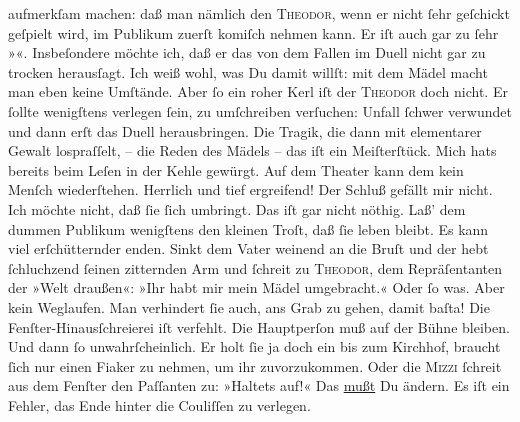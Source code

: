                aufmerkſam machen: daß man nämlich den \textsc{Theodor}, wenn er nicht  ſehr geſchickt
               geſpielt wird, im Publikum zuerſt komiſch nehmen kann. Er iſt auch gar zu ſehr
                  »\label{K_L02726-4v}\label{K_L02726-4}«. Insbeſondere
               möchte ich, daß er das von dem Fallen im Duell nicht gar zu trocken herausſagt. Ich
               weiß wohl, was Du damit willſt: mit {\pb}dem Mädel macht
               man eben keine Umſtände. Aber ſo ein roher Kerl iſt der \textsc{Theodor} doch nicht. Er ſollte wenigſtens verlegen ſein, zu umſchreiben verſuchen:
               Unfall {\dotsfour} ſchwer verwundet {\dotsfour} und
                   dann erſt das Duell herausbringen. Die Tragik,
               die dann mit elementarer Gewalt lospraſſelt, – die Reden des Mädels – das iſt ein Meiſterſtück. Mich hats bereits
               beim Leſen in der Kehle gewürgt. Auf dem Theater kann dem kein Menſch wiederſtehen.
               Herrlich und tief ergreifend! Der Schluß gefällt mir nicht. Ich möchte nicht, daß ſie ſich umbringt. Das iſt
                  {\pb}gar nicht nöthig. Laß’ dem dummen Publikum
               wenigſtens den kleinen Troſt, daß ſie leben bleibt. Es kann viel erſchütternder
               enden. Sinkt dem Vater weinend an die Bruſt und der hebt ſchluchzend ſeinen
               zitternden Arm und ſchreit zu \textsc{Theodor}, dem Repräſentanten der »Welt draußen«: »Ihr habt mir mein Mädel umgebracht.«
               Oder ſo was. Aber kein Weglaufen. Man verhindert  ſie auch, ans Grab zu gehen, damit baſta! Die Fenſter-Hinausſchreierei iſt
               verfehlt. Die Hauptperſon muß
               auf der Bühne bleiben. Und dann ſo unwahrſcheinlich. {\pb}Er holt ſie ja doch ein\strikeout{;} bis zum Kirchhof, braucht
               ſich nur einen Fiaker zu nehmen, um ihr zuvorzukommen. Oder die \textsc{Mizzi} ſchreit aus dem Fenſter den Paſſanten zu: »Haltets auf!« Das \uline{mußt} Du ändern. Es iſt ein Fehler, das Ende hinter die
               Couliſſen zu verlegen.\pend
           
